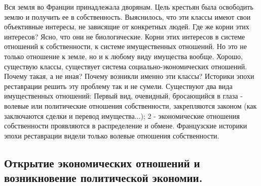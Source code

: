 Вся земля во Франции принадлежала дворянам. Цель крестьян была освободить землю и получить ее в собственность. Выяснилось, что эти классы имеют свои объективные интересы, не зависящие от конкретных людей. Где же корни этих интересов? Ясно, что они не биологические. Корни этих интересов в системе отношений к собственности, к системе имущественных отношений. Но это не только отношение к земле, но и к любому виду имущества вообще. Хорошо, существую классы, существует система социально-экономических отношений. Почему такая, а не иная? Почему возникли именно эти классы? Историки эпохи реставрации решить эту проблему так и не сумели. Существуют два вида имущественных отношений: Первый вид, очевидный, бросающийся в глаза - волевые или политические отношения собственности, закрепляются законом (как заключаются сделки и перевод имущества...); 2 - экономические отношения собственности проявляются в распределение и обмене. Французские историки эпохи реставрации видели только волевые отношения собственности.
\subsection{Открытие экономических отношений и возникновение политической экономии.}

